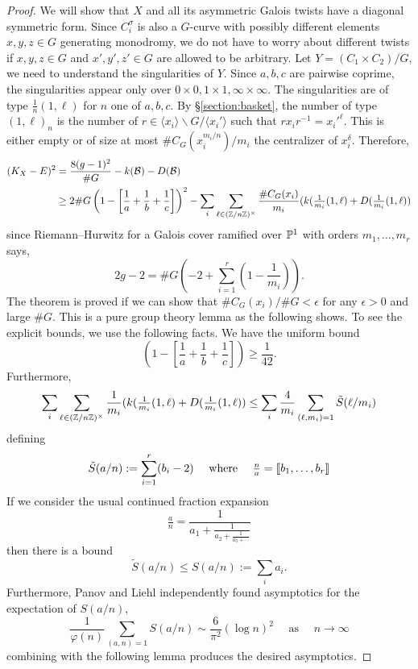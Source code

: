 \documentclass[main.tex]{subfiles}
\begin{document}
\begin{proof}
We will show that $X$ and all its asymmetric Galois twists have a diagonal symmetric form. Since $C_i^{\sigma}$ is also a $G$-\Belyi curve with possibly different elements $x,y,z \in G$ generating monodromy, we do not have to worry about different twists if $x,y,z \in G$ and $x',y',z' \in G$ are allowed to be arbitrary. Let $Y = (C_1 \times C_2) / G$, we need to understand the singularities of $Y$. Since $a,b,c$ are pairwise coprime, the singularities appear only over $0 \times 0, 1 \times 1, \infty \times \infty$. The singularities are of type $\frac{1}{n}(1,\ell)$ for $n$ one of $a,b,c$. By \S\ref{section:basket}, the number of type $(1,\ell)_n$ is the number of $r \in \langle x_i \rangle \backslash G / \langle x_i' \rangle$ such that $r x_i r^{-1} = x_i'^{\ell}$. 
This is either empty or of size at most $\# C_G(x_i^{m_i/n}) / m_i$ the centralizer of $x_i^{\delta}$. 
Therefore,
\begin{align*}
(K_X - E)^2 &= \frac{8 (g-1)^2}{\# G} - k(\mathcal{B}) - D(\mathcal{B}) 
\\
& \ge 2 \# G \left( 1 - \left[\frac{1}{a} + \frac{1}{b} + \frac{1}{c}\right]\right)^2 - \sum_i  \sum_{\ell \in (\Z / n \Z)^{\times}} \frac{\# C_G(x_i)}{m_i} (k(\tfrac{1}{m_i}(1,\ell) + D(\tfrac{1}{m_i}(1,\ell))  
\end{align*}
since Riemann--Hurwitz for a Galois cover ramified over $\P^1$ with orders $m_1, \dots, m_r$ says,
\[ 2 g - 2 = \# G \left( -2 + \sum_{i = 1}^r \left( 1 - \frac{1}{m_i} \right) \right). \]
The theorem is proved if we can show that $\# C_G(x_i) / \# G < \epsilon$ for any $\epsilon > 0$ and large $\# G$. This is a pure group theory lemma as the following shows. To see the explicit bounds, we use the following facts. We have the uniform bound
\[ \left( 1 - \left[\frac{1}{a} + \frac{1}{b} + \frac{1}{c}\right]\right) \ge \frac{1}{42}. \]
Furthermore, 
\[ \sum_i  \sum_{\ell \in (\Z / n \Z)^{\times}} \frac{1}{m_i} (k(\tfrac{1}{m_i}(1,\ell) + D(\tfrac{1}{m_i}(1,\ell)) \le \sum_i \frac{4}{m_i} \sum_{(\ell, m_i) = 1} \tilde{S}(\ell/m_i) \]
defining
\[ \tilde{S}(a/n) := \sum_{i=1}^r (b_i - 2) \quad \text{ where } \quad \tfrac{n}{a} = \dbrac{b_1, \dots, b_r} \]
If we consider the usual continued fraction expansion
\[ \tfrac{a}{n} = \frac{1}{a_1 + \frac{1}{a_2 + \frac{1}{a_3 + \cdots}}} \]
then there is a bound 
\[ \tilde{S}(a/n) \le S(a/n) := \sum_i a_i. \]
Furthermore, Panov \cite{panov:continued_fractions} and Liehl \cite{liehl:dedekind_sums} independently found asymptotics for the expectation of $S(a/n)$,
\[ \frac{1}{\varphi(n)} \sum_{(a,n) = 1} S(a/n) \sim \frac{6}{\pi^2} (\log{n})^2 \quad \text{ as } \quad n \to \infty \]
combining with the following lemma produces the desired asymptotics.
\end{proof}
\end{document}
